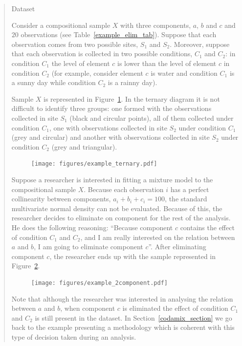 \documentclass[10pt, a4paper]{article}
\begin{document}
\begin{quote}
\begin{table}
\centering
\scriptsize

\label{example_elim_tab}
\caption{Dataset}
\end{table}

Consider a compositional sample $X$ with three components, $a$, $b$ and $c$ and $20$ observations (see Table~\ref{example_elim_tab}). Suppose that each observation comes from two possible sites, $S_1$ and $S_2$. Moreover, suppose that each observation is collected in two possible conditions, $C_1$ and $C_2$: in condition $C_1$ the level of element $c$ is lower than the level of element $c$ in condition $C_2$ (for example, consider element $c$ is water and condition $C_1$ is a sunny day while condition $C_2$ is a rainny day).

Sample $X$ is represented in Figure~\ref{example_elim_component}. In the ternary diagram it is not difficult to identify three groups: one formed with the observations collected in site $S_1$ (black and circular points), all of them collected under condition $C_1$, one with observations collected in site $S_2$ under condition $C_1$ (grey and circular) and another with observations collected in site $S_2$ under condition $C_2$ (grey and triangular).

\begin{figure}[thbp]
\centering
\texttt{[image: figures/example\_ternary.pdf]}
\caption{}\label{example_elim_component}
\end{figure}

Suppose a researcher is interested in fitting a mixture model to the compositional sample $X$. Because each observation $i$ has a perfect collinearity between components, $a_i+b_i+c_i = 100$, the standard multivariate normal density can not be evaluated. Because of this, the researcher decides to eliminate on component for the rest of the analysis. He does the following reasoning: ``Because component $c$ contains the effect of condition $C_1$ and $C_2$, and I am really interested on the relation between $a$ and $b$, I am going to eliminate component $c$''. After eliminating component $c$, the researcher ends up with the sample represented in Figure~\ref{example_elim_2_components}.

\begin{figure}[thbp]
\centering
\texttt{[image: figures/example\_2component.pdf]}
\caption{}\label{example_elim_2_components}
\end{figure}

Note that although the researcher was interested in analysing the relation between $a$ and $b$, when component $c$ is eliminated the effect of condition $C_1$ and $C_2$  is still present in the dataset. In Section~\ref{codamix_section} we go back to the example presenting a methodology which is coherent with this type of decision taken during an analysis.

\end{quote}
\end{document}
